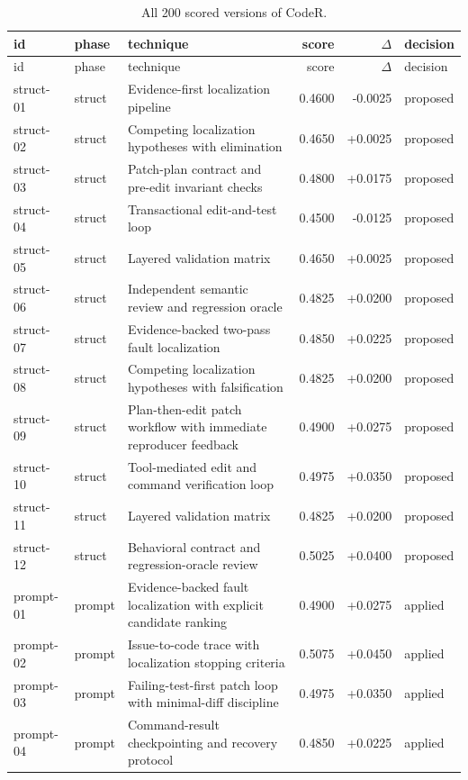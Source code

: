 \begin{center}\scriptsize\begin{longtable}{llp{5.2cm}rrl}
\caption{All 200 scored versions of CodeR.}\\
\toprule id & phase & technique & score & $\Delta$ & decision \\ \midrule \endfirsthead
\toprule id & phase & technique & score & $\Delta$ & decision \\ \midrule \endhead
struct-01 & struct & Evidence-first localization pipeline & 0.4600 & -0.0025 & proposed \\
struct-02 & struct & Competing localization hypotheses with elimination & 0.4650 & +0.0025 & proposed \\
struct-03 & struct & Patch-plan contract and pre-edit invariant checks & 0.4800 & +0.0175 & proposed \\
struct-04 & struct & Transactional edit-and-test loop & 0.4500 & -0.0125 & proposed \\
struct-05 & struct & Layered validation matrix & 0.4650 & +0.0025 & proposed \\
struct-06 & struct & Independent semantic review and regression oracle & 0.4825 & +0.0200 & proposed \\
struct-07 & struct & Evidence-backed two-pass fault localization & 0.4850 & +0.0225 & proposed \\
struct-08 & struct & Competing localization hypotheses with falsification & 0.4825 & +0.0200 & proposed \\
struct-09 & struct & Plan-then-edit patch workflow with immediate reproducer feedback & 0.4900 & +0.0275 & proposed \\
struct-10 & struct & Tool-mediated edit and command verification loop & 0.4975 & +0.0350 & proposed \\
struct-11 & struct & Layered validation matrix & 0.4825 & +0.0200 & proposed \\
struct-12 & struct & Behavioral contract and regression-oracle review & 0.5025 & +0.0400 & proposed \\
prompt-01 & prompt & Evidence-backed fault localization with explicit candidate ranking & 0.4900 & +0.0275 & applied \\
prompt-02 & prompt & Issue-to-code trace with localization stopping criteria & 0.5075 & +0.0450 & applied \\
prompt-03 & prompt & Failing-test-first patch loop with minimal-diff discipline & 0.4975 & +0.0350 & applied \\
prompt-04 & prompt & Command-result checkpointing and recovery protocol & 0.4850 & +0.0225 & applied \\

\end{longtable}
\end{center}
